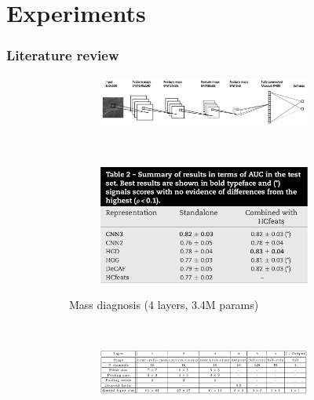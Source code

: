 \documentclass{beamer}
\begin{document}
	\section[Experiments]{Experiments}
	\begin{frame}
		\frametitle{Literature review}
		\vspace{15pt}
		\begin{figure}
			\centering
			\begin{subfigure}{0.48\textwidth}
				\begin{subfigure}{\textwidth}
					\includegraphics[width=\textwidth]{plots/arevalo.png}
				\end{subfigure}
				~
				\begin{subfigure}{\textwidth}
					\includegraphics[width=\textwidth]{plots/arevaloResults.png}
				\end{subfigure}
				\caption{Mass diagnosis (4 layers, 3.4M params)}
			\end{subfigure}
			~
			\begin{subfigure}{0.48\textwidth}
				\begin{subfigure}{\textwidth}
					\includegraphics[width=\textwidth]{plots/dubrovina1.png}

\end{subfigure}
\end{subfigure}
\end{figure}
\end{frame}
\end{document}
